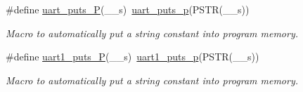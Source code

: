 \begin{DoxyCompactItemize}
\mbox{\label{group__pfleury__uart_gae9e143569df2285379bc55f9f5595bf9}} 
\#define \hyperlink{group__pfleury__uart_gae9e143569df2285379bc55f9f5595bf9}{uart\+\_\+puts\+\_\+P}(\+\_\+\+\_\+s)~\hyperlink{group__pfleury__uart_ga6d78b6744db6232f52b4616402036c2f}{uart\+\_\+puts\+\_\+p}(P\+S\+TR(\+\_\+\+\_\+s))
\begin{DoxyCompactList}\small\item\em Macro to automatically put a string constant into program memory. \end{DoxyCompactList}\item 
\mbox{\label{group__pfleury__uart_gaabd7a5b0c15611ee9ecb2873cc9ee87a}} 
\#define \hyperlink{group__pfleury__uart_gaabd7a5b0c15611ee9ecb2873cc9ee87a}{uart1\+\_\+puts\+\_\+P}(\+\_\+\+\_\+s)~\hyperlink{group__pfleury__uart_ga1e8074d0a2d5922601c5db2f9777ba79}{uart1\+\_\+puts\+\_\+p}(P\+S\+TR(\+\_\+\+\_\+s))
\begin{DoxyCompactList}\small\item\em Macro to automatically put a string constant into program memory. \end{DoxyCompactList}\end{DoxyCompactItemize}
